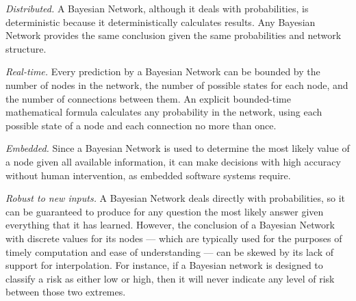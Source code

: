 \documentclass[conference]{IEEEtran}
\begin{document}
	\emph{Distributed.} A Bayesian Network, although it deals with probabilities, is deterministic because it deterministically calculates results. Any Bayesian Network provides the same conclusion given the same probabilities and network structure.
	
	\emph{Real-time.} Every prediction by a Bayesian Network
can be bounded by the number of nodes in the network, the number of possible states for each node, and the number of connections between them.
An explicit bounded-time mathematical formula calculates any probability in the network, using each possible state of a node and each connection no more than once.
	
	\emph{Embedded.} Since a Bayesian Network is used to determine the most likely value of a node given all available information, it can make decisions with high accuracy without human intervention, as embedded software systems require.
	
	\emph{Robust to new inputs.} A Bayesian Network deals directly with probabilities, so it can be guaranteed to produce for any question the most likely answer given everything that it has learned. However, the conclusion of a Bayesian Network with discrete values for its nodes --- which are typically used for the purposes of timely computation and ease of understanding ---
can be skewed by its lack of support for interpolation.
For instance, if a Bayesian network is designed to classify a risk as either low or high, then it will never indicate any level of risk between those two extremes.
	
\end{document}
